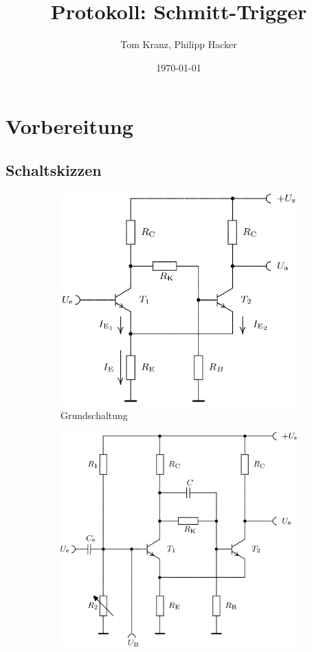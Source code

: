 \documentclass[numbers=noenddot,10pt,a4paper]{scrartcl}
\title{Protokoll: Schmitt-Trigger}
\author{Tom Kranz, Philipp Hacker}
\date{\today}
\begin{document}
\maketitle
\vspace*{\fill}
\tableofcontents
\vfill
\newpage
\section{Vorbereitung}
\subsection{Schaltskizzen}
\begin{figure}[H]
\centering
\begin{subfigure}[b]{0.49\textwidth}
\includegraphics[width=\textwidth]{schaltskizze_st2.png}
\caption{Grundschaltung}
\end{subfigure}
\begin{subfigure}[b]{0.49\textwidth}
\includegraphics[width=\textwidth]{schaltskizze_st1.png}

\end{subfigure}
\end{figure}
\end{document}
